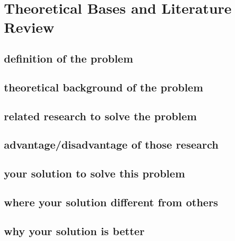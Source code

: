 \section{Theoretical Bases and Literature Review}

\subsection{definition of the problem}
\subsection{theoretical background of the problem}
\subsection{related research to solve the problem}
\subsection{advantage/disadvantage of those research}
\subsection{your solution to solve this problem}
\subsection{where your solution different from others}
\subsection{why your solution is better}